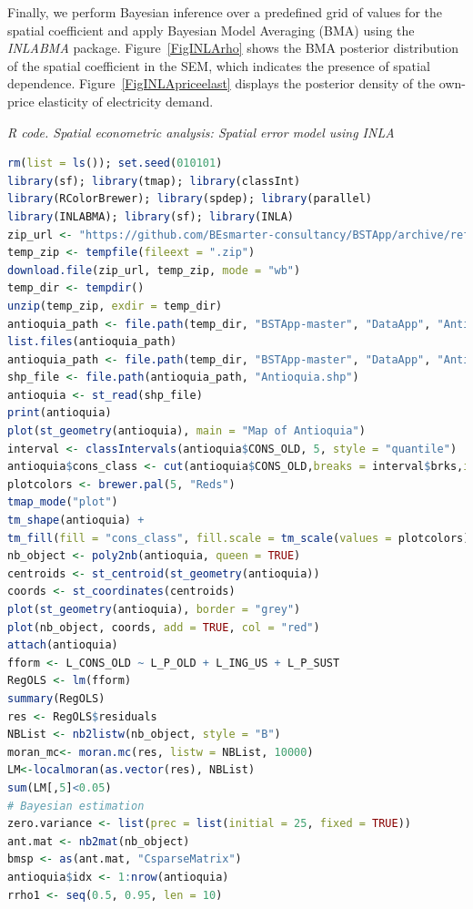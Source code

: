 Finally, we perform Bayesian inference over a predefined grid of values for the spatial coefficient and apply Bayesian Model Averaging (BMA) using the \textit{INLABMA} package. Figure~\ref{FigINLArho} shows the BMA posterior distribution of the spatial coefficient in the SEM, which indicates the presence of spatial dependence. Figure~\ref{FigINLApriceelast} displays the posterior density of the own-price elasticity of electricity demand.
   
\begin{tcolorbox}[enhanced,width=4.67in,center upper,
	fontupper=\large\bfseries,drop shadow southwest,sharp corners]
	\textit{R code. Spatial econometric analysis: Spatial error model using INLA}
	\begin{VF}
		\begin{lstlisting}[language=R]
rm(list = ls()); set.seed(010101)
library(sf); library(tmap); library(classInt)
library(RColorBrewer); library(spdep); library(parallel)
library(INLABMA); library(sf); library(INLA)
zip_url <- "https://github.com/BEsmarter-consultancy/BSTApp/archive/refs/heads/master.zip"
temp_zip <- tempfile(fileext = ".zip")
download.file(zip_url, temp_zip, mode = "wb")
temp_dir <- tempdir()
unzip(temp_zip, exdir = temp_dir)
antioquia_path <- file.path(temp_dir, "BSTApp-master", "DataApp", "Antioquia")
list.files(antioquia_path)
antioquia_path <- file.path(temp_dir, "BSTApp-master", "DataApp", "Antioquia")
shp_file <- file.path(antioquia_path, "Antioquia.shp")
antioquia <- st_read(shp_file)
print(antioquia)
plot(st_geometry(antioquia), main = "Map of Antioquia")
interval <- classIntervals(antioquia$CONS_OLD, 5, style = "quantile")
antioquia$cons_class <- cut(antioquia$CONS_OLD,breaks = interval$brks,include.lowest = TRUE)
plotcolors <- brewer.pal(5, "Reds")
tmap_mode("plot")
tm_shape(antioquia) +
tm_fill(fill = "cons_class", fill.scale = tm_scale(values = plotcolors), fill.legend = tm_legend(title = "Electricity consumption")) + tm_borders(col = "grey90") + tm_compass(type = "8star", position = c("right", "top")) + tm_layout(legend.outside = TRUE)
nb_object <- poly2nb(antioquia, queen = TRUE)
centroids <- st_centroid(st_geometry(antioquia))
coords <- st_coordinates(centroids)
plot(st_geometry(antioquia), border = "grey")
plot(nb_object, coords, add = TRUE, col = "red")
attach(antioquia)
fform <- L_CONS_OLD ~ L_P_OLD + L_ING_US + L_P_SUST 
RegOLS <- lm(fform)
summary(RegOLS)
res <- RegOLS$residuals
NBList <- nb2listw(nb_object, style = "B")
moran_mc<- moran.mc(res, listw = NBList, 10000)
LM<-localmoran(as.vector(res), NBList)
sum(LM[,5]<0.05)
# Bayesian estimation
zero.variance <- list(prec = list(initial = 25, fixed = TRUE))
ant.mat <- nb2mat(nb_object)
bmsp <- as(ant.mat, "CsparseMatrix")
antioquia$idx <- 1:nrow(antioquia)
rrho1 <- seq(0.5, 0.95, len = 10)
\end{lstlisting}
	\end{VF}
\end{tcolorbox}

